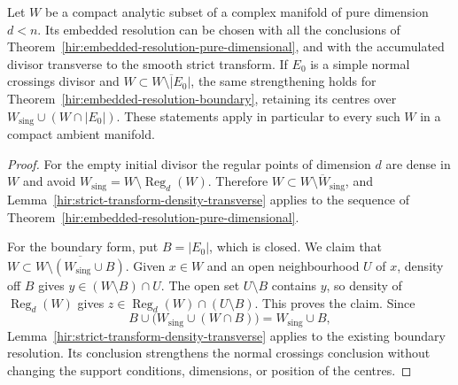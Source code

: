 \begin{theorem}
\label{hir:embedded-resolution-transverse-boundary}
\leanok
Let \(W\) be a compact analytic subset of a complex manifold of pure dimension \(d<n\). Its embedded resolution can be chosen with all the conclusions of Theorem~\ref{hir:embedded-resolution-pure-dimensional}, and with the accumulated divisor transverse to the smooth strict transform. If \(E_0\) is a simple normal crossings divisor and \(W\subset\overline{W\setminus|E_0|}\), the same strengthening holds for Theorem~\ref{hir:embedded-resolution-boundary}, retaining its centres over \(W_{\mathrm{sing}}\cup(W\cap|E_0|)\). These statements apply in particular to every such \(W\) in a compact ambient manifold.
\end{theorem}
\begin{proof}
For the empty initial divisor the regular points of dimension \(d\) are dense in \(W\) and avoid \(W_{\mathrm{sing}}=W\setminus\operatorname{Reg}_d(W)\). Therefore \(W\subset\overline{W\setminus W_{\mathrm{sing}}}\), and Lemma~\ref{hir:strict-transform-density-transverse} applies to the sequence of Theorem~\ref{hir:embedded-resolution-pure-dimensional}.

For the boundary form, put \(B=|E_0|\), which is closed. We claim that \(W\subset\overline{W\setminus(W_{\mathrm{sing}}\cup B)}\). Given \(x\in W\) and an open neighbourhood \(U\) of \(x\), density off \(B\) gives \(y\in(W\setminus B)\cap U\). The open set \(U\setminus B\) contains \(y\), so density of \(\operatorname{Reg}_d(W)\) gives \(z\in\operatorname{Reg}_d(W)\cap(U\setminus B)\). This proves the claim. Since
\[
 B\cup\bigl(W_{\mathrm{sing}}\cup(W\cap B)\bigr)
 =W_{\mathrm{sing}}\cup B,
\]
Lemma~\ref{hir:strict-transform-density-transverse} applies to the existing boundary resolution. Its conclusion strengthens the normal crossings conclusion without changing the support conditions, dimensions, or position of the centres.
\end{proof}

